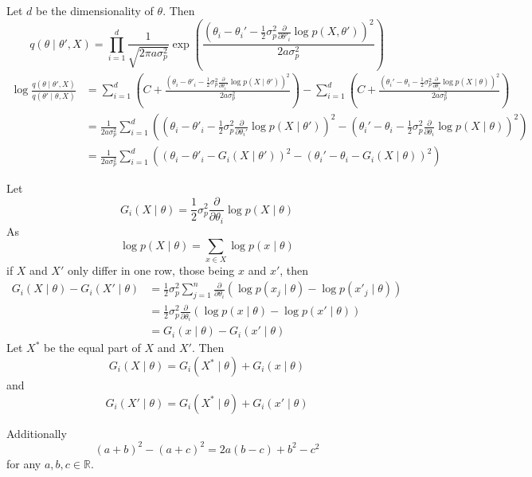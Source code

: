 \documentclass[english,twoside,openright]{HYgraduMLDS}
\newcommand{\R}{\mathbb{R}}
\begin{document}
Let \(d\) be the dimensionality of \(\theta\). Then
\[
    q(\theta\mid \theta', X) = \prod_{i=1}^d
    \frac{1}{\sqrt{2\pi a\sigma_p^2}}\exp\left(
    \frac{(\theta_i - \theta_i' - \frac{1}{2}\sigma_p^2
    \frac{\partial}{\partial \theta'_i} \log p(X, \theta'))^2}
    {2a\sigma_p^2}\right)
\]
\begin{align*}
    \log \frac{q(\theta\mid \theta', X)}{q(\theta'\mid \theta, X)}
    &= \sum_{i=1}^d \left(C +
    \frac{(\theta_i - \theta'_i
    - \frac{1}{2}\sigma_p^2\frac{\partial}{\partial \theta_i'} \log p(X\mid \theta'))^2}
    {2a\sigma_p^2}\right)
    - \sum_{i=1}^d \left(C +
    \frac{(\theta_i' - \theta_i 
    - \frac{1}{2}\sigma_p^2\frac{\partial}{\partial \theta_i} \log p(X\mid \theta))^2}
    {2a\sigma_p^2}\right)
  \\&=\frac{1}{2a\sigma_p^2} \sum_{i=1}^d \left(
    (\theta_i - \theta'_i
    - \frac{1}{2}\sigma_p^2\frac{\partial}{\partial \theta_i'} \log p(X\mid \theta'))^2
    - (\theta_i' - \theta_i 
    - \frac{1}{2}\sigma_p^2\frac{\partial}{\partial \theta_i} \log p(X\mid \theta))^2
    \right)
  \\&=\frac{1}{2a\sigma_p^2} \sum_{i=1}^d \left(
    (\theta_i - \theta'_i - G_i(X\mid \theta'))^2
    - (\theta_i' - \theta_i - G_i(X\mid \theta))^2\right)
\end{align*}

Let 
\[
    G_i(X\mid \theta) = \frac{1}{2}\sigma_p^2\frac{\partial}{\partial \theta_i}
    \log p(X\mid \theta)
\]
As 
\[
    \log p(X\mid \theta) = \sum_{x\in X}\log p(x\mid \theta)
\]
if \(X\) and \(X'\) only differ in one row, those being \(x\) and \(x'\),
then
\begin{align*}
    G_i(X\mid \theta) - G_i(X'\mid \theta) 
    &= \frac{1}{2}\sigma_p^2\sum_{j=1}^n \frac{\partial}{\partial \theta_i}
    (\log p(x_j\mid \theta) - \log p(x'_j\mid \theta))
  \\&= \frac{1}{2}\sigma_p^2 \frac{\partial}{\partial \theta_i}
    (\log p(x\mid \theta) - \log p(x'\mid \theta))
  \\&= G_i(x\mid \theta) - G_i(x'\mid \theta)
\end{align*}
Let \(X^*\) be the equal part of \(X\) and \(X'\). Then 
\[
G_i(X\mid \theta) = G_i(X^*\mid \theta) + G_i(x\mid \theta)
\]
and 
\[
    G_i(X'\mid \theta) = G_i(X^*\mid \theta) + G_i(x'\mid \theta)
\]

Additionally
\[
    (a + b)^2 - (a + c)^2 = 2a(b - c) + b^2 - c^2
\]
for any \(a, b, c\in \R\).
\end{document}
